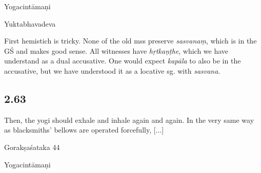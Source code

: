 \begin{ekdosis}
\begin{testimonia}[hp02_062]
Yogacintāmaṇi

\begin{versinnote}
\end{versinnote}

Yuktabhavadeva

\begin{versinnote}
\end{versinnote}
\end{testimonia}

\begin{philcomm}[hp02_062]
First hemistich is tricky. None of the old mss preserve \emph{sasvanaṃ}, which is in the GŚ and makes good sense. All witnesses have \emph{hṛtkaṇṭhe}, which we have understand as a dual accusative. One would expect \emph{kapāla} to also be in the accusative, but we have understood it as a locative sg. with \emph{sasvana}.
\end{philcomm}

\subsection*{2.63}
\begin{translation}[hp02_063]
Then, the yogi should exhale and inhale again and again. In the very same way as blacksmiths’ bellows are operated forcefully, [...]
\end{translation}

\begin{sources}[hp02_063]
Gorakṣaśataka 44

\begin{versinnote}
\end{versinnote}
\end{sources}

\begin{testimonia}[hp02_063]
Yogacintāmaṇi

\begin{versinnote}
\end{versinnote}


\end{testimonia}
\end{ekdosis}
